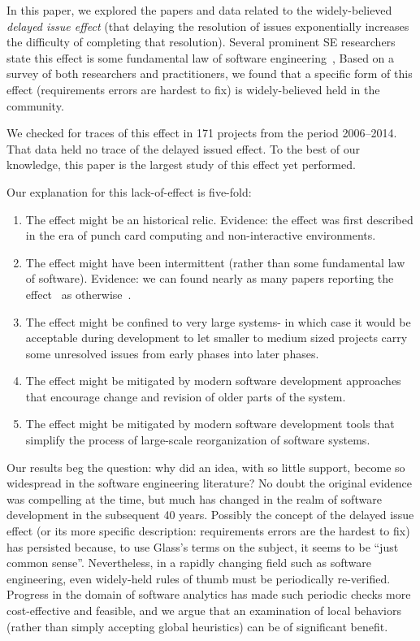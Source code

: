 \documentclass{sig-alternate}
\newcommand{\be}{\begin{enumerate}}
\newcommand{\ee}{\end{enumerate}}
\begin{document}
In this paper, we explored   the papers and data related to the 
widely-believed {\em delayed issue effect} (that delaying the resolution of issues
exponentially 
increases the difficulty of completing that  resolution).
Several prominent SE researchers state this effect is some fundamental law of software engineering~\cite{boehm01,mcconnell01,boehm01,glass02},
Based on a  survey  of both researchers and practitioners, we  found that
a specific form  of this effect (requirements errors are hardest to fix) is  widely-believed
held in the community.  

We checked for traces of this effect in 171 projects from the period 2006--2014.
That data held no trace of the delayed issued effect.
To the best of our knowledge, this paper is the  largest study
of this effect yet performed.

Our explanation for this lack-of-effect is five-fold:
\be
\item The effect might be an historical relic. Evidence:
the effect was first described in the era of punch card computing and non-interactive environments.
\item The effect might have been intermittent (rather than some fundamental law of software). Evidence: we can  found nearly
as many papers reporting the effect~\cite{Boehm76,Boehm81,steck04,Fagan76,Stephenson76} as otherwise~\cite{Royce98,Boehm80,Shull02}.
\item The effect might be confined to very large systems- in which case it would be
acceptable during development to let smaller to medium
sized projects carry some unresolved issues from early phases into later phases.
\item The effect might be mitigated by modern software development approaches that
encourage change and revision of older parts of the system.
\item The effect might be mitigated by modern software development tools
that simplify the process of large-scale reorganization of software systems.
\ee
Our results beg the question: why did an idea, with so little support, become so widespread in the software engineering literature? No doubt the original evidence was compelling at the time, but much has changed in the realm of software development in the subsequent 40 years. Possibly the concept of the delayed issue effect (or its more specific description: requirements errors are the hardest to fix)
has persisted because, to use Glass's terms on the subject, it seems to be ``just common sense''\cite{glass02}. 
Nevertheless, in a rapidly changing field such as software engineering, even widely-held rules of thumb must be periodically re-verified. 
Progress in the domain of software analytics has made such periodic checks more cost-effective and feasible, and we argue that an examination of local behaviors (rather than simply accepting global heuristics) can be of significant benefit.
\end{document}
